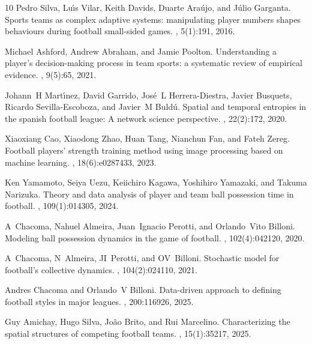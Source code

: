 \documentclass[preprint,12pt]{elsarticle}
\begin{document}
\begin{thebibliography}{10}
Pedro Silva, Lu{\'\i}s Vilar, Keith Davids, Duarte Ara{\'u}jo, and J{\'u}lio
  Garganta.
\newblock Sports teams as complex adaptive systems: manipulating player numbers
  shapes behaviours during football small-sided games.
, 5(1):191, 2016.

Michael Ashford, Andrew Abraham, and Jamie Poolton.
\newblock Understanding a player’s decision-making process in team sports: a
  systematic review of empirical evidence.
, 9(5):65, 2021.

Johann~H Mart{\'\i}nez, David Garrido, Jos{\'e}~L Herrera-Diestra, Javier
  Busquets, Ricardo Sevilla-Escoboza, and Javier~M Buld{\'u}.
\newblock Spatial and temporal entropies in the spanish football league: A
  network science perspective.
, 22(2):172, 2020.

Xiaoxiang Cao, Xiaodong Zhao, Huan Tang, Nianchun Fan, and Fateh Zereg.
\newblock Football players’ strength training method using image processing
  based on machine learning.
, 18(6):e0287433, 2023.

Ken Yamamoto, Seiya Uezu, Keiichiro Kagawa, Yoshihiro Yamazaki, and Takuma
  Narizuka.
\newblock Theory and data analysis of player and team ball possession time in
  football.
, 109(1):014305, 2024.

A~Chacoma, Nahuel Almeira, Juan~Ignacio Perotti, and Orlando~Vito Billoni.
\newblock Modeling ball possession dynamics in the game of football.
, 102(4):042120, 2020.

A~Chacoma, N~Almeira, JI~Perotti, and OV~Billoni.
\newblock Stochastic model for football's collective dynamics.
, 104(2):024110, 2021.

Andres Chacoma and Orlando~V Billoni.
\newblock Data-driven approach to defining football styles in major leagues.
, 200:116926, 2025.

Guy Amichay, Hugo Silva, Jo{\~a}o Brito, and Rui Marcelino.
\newblock Characterizing the spatial structures of competing football teams.
, 15(1):35217, 2025.


\end{thebibliography}
\end{document}
